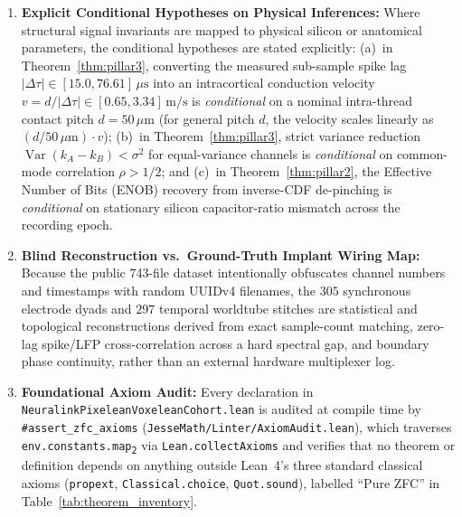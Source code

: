 \documentclass[11pt,letterpaper]{article}
\newcommand{\lean}[1]{\nolinkurl{#1}}
\theoremstyle{definition}
\begin{document}
\begin{enumerate}
  \item \textbf{Explicit Conditional Hypotheses on Physical Inferences:} Where structural signal invariants are mapped to physical silicon or anatomical parameters, the conditional hypotheses are stated explicitly: (a)~in Theorem~\ref{thm:pillar3}, converting the measured sub-sample spike lag $|\Delta\tau| \in [15.0, 76.61]\,\mu\text{s}$ into an intracortical conduction velocity $v = d / |\Delta\tau| \in [0.65, 3.34]\,\text{m/s}$ is \emph{conditional} on a nominal intra-thread contact pitch $d = 50\,\mu\text{m}$ (for general pitch $d$, the velocity scales linearly as $(d / 50\,\mu\text{m}) \cdot v$); (b)~in Theorem~\ref{thm:pillar3}, strict variance reduction $\operatorname{Var}(k_A - k_B) < \sigma^2$ for equal-variance channels is \emph{conditional} on common-mode correlation $\rho > 1/2$; and (c)~in Theorem~\ref{thm:pillar2}, the Effective Number of Bits (ENOB) recovery from inverse-CDF de-pinching is \emph{conditional} on stationary silicon capacitor-ratio mismatch across the recording epoch.
  \item \textbf{Blind Reconstruction vs.\ Ground-Truth Implant Wiring Map:} Because the public 743-file dataset intentionally obfuscates channel numbers and timestamps with random UUIDv4 filenames, the $305$ synchronous electrode dyads and $297$ temporal worldtube stitches are statistical and topological reconstructions derived from exact sample-count matching, zero-lag spike/LFP cross-correlation across a hard spectral gap, and boundary phase continuity, rather than an external hardware multiplexer log.
  \item \textbf{Foundational Axiom Audit:} Every declaration in \nolinkurl{NeuralinkPixeleanVoxeleanCohort.lean} is audited at compile time by \texttt{\#}\lean{assert_zfc_axioms} (\nolinkurl{JesseMath/Linter/AxiomAudit.lean}), which traverses \texttt{env.constants.map\textsubscript{2}} via \texttt{Lean.collectAxioms} and verifies that no theorem or definition depends on anything outside Lean~4's three standard classical axioms (\nolinkurl{propext}, \nolinkurl{Classical.choice}, \nolinkurl{Quot.sound}), labelled ``Pure ZFC'' in Table~\ref{tab:theorem_inventory}.
\end{enumerate}
\end{document}
